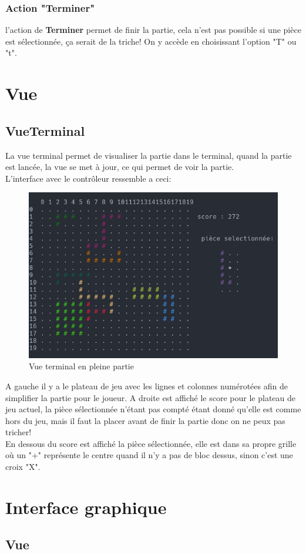 \documentclass[a4paper,12pt]{article} %
\begin{document}
\subsubsection{Action "Terminer"}
l'action de \textbf{Terminer} permet de finir la partie, cela n'est pas possible si une pièce est sélectionnée, ça serait de la triche! On y accède en choisissant l'option "T" ou "t".
\section{Vue}
\subsection{VueTerminal}
La vue terminal permet de visualiser la partie dans le terminal, quand la partie est lancée, la vue se met à jour, ce qui permet de voir la partie. \\
L'interface avec le contrôleur ressemble a ceci:
\begin{figure}[ht]
    \centering
    \includegraphics[width=0.5\linewidth]{images/vueterminal1.png}
    \caption{Vue terminal en pleine partie}
\end{figure}

A gauche il y a le plateau de jeu avec les lignes et colonnes numérotées afin de simplifier la partie pour le joueur.
A droite est affiché le score pour le plateau de jeu actuel, la pièce sélectionnée n'étant pas compté étant donné qu'elle est comme hors du jeu, mais il faut la placer avant de finir la partie donc on ne peux pas tricher!\\
En dessous du score est affiché la pièce sélectionnée, elle est dans sa propre grille où un "+" représente le centre quand il n'y a pas de bloc dessus, sinon c'est une croix "X".

\section{Interface graphique}

\subsection{Vue}
\end{document}
